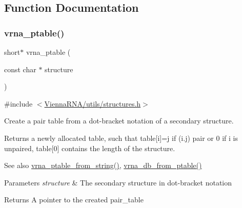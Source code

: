 \subsection{Function Documentation}
\mbox{\label{group__struct__utils__pair__table_gae829fb8bb7f694c12a9c0bbc34c77c60}} 
\subsubsection{\texorpdfstring{vrna\_ptable()}{vrna\_ptable()}}
{\footnotesize\ttfamily short$\ast$ vrna\+\_\+ptable (\begin{DoxyParamCaption}\item[{const char $\ast$}]{structure }\end{DoxyParamCaption})}



{\ttfamily \#include $<$\mbox{\hyperlink{utils_2structures_8h}{Vienna\+R\+N\+A/utils/structures.\+h}}$>$}



Create a pair table from a dot-\/bracket notation of a secondary structure. 

Returns a newly allocated table, such that table\mbox{[}i\mbox{]}=j if (i.\+j) pair or 0 if i is unpaired, table\mbox{[}0\mbox{]} contains the length of the structure.

\begin{DoxySeeAlso}{See also}
\mbox{\hyperlink{group__struct__utils__pair__table_gac76c9ef3de507748fb0416a59323362b}{vrna\+\_\+ptable\+\_\+from\+\_\+string()}}, \mbox{\hyperlink{group__struct__utils__dot__bracket_gaf9ecd0d7877fecdbb0292e24f40283d5}{vrna\+\_\+db\+\_\+from\+\_\+ptable()}}
\end{DoxySeeAlso}

\begin{DoxyParams}{Parameters}
{\em structure} & The secondary structure in dot-\/bracket notation \\
\hline
\end{DoxyParams}
\begin{DoxyReturn}{Returns}
A pointer to the created pair\+\_\+table 
\end{DoxyReturn}
\mbox{\label{group__struct__utils__pair__table_gac76c9ef3de507748fb0416a59323362b}} 
